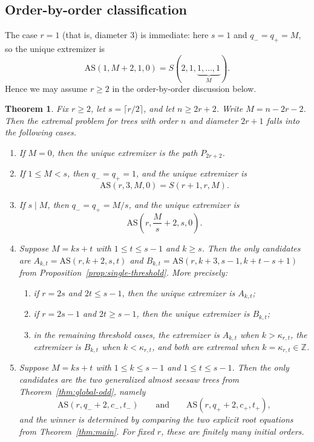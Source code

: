 \documentclass[11pt]{article}
\newtheorem{theorem}{Theorem}[section]
\theoremstyle{remark}
\newcommand{\AS}{\mathrm{AS}}
\begin{document}
\subsection{Order-by-order classification}
The case $r=1$ (that is, diameter $3$) is immediate: here $s=1$ and $q_-=q_+=M$, so the unique extremizer is
$$
\AS(1,M+2,1,0)=S(2,1,\underbrace{1,\dots,1}_{M}).
$$
Hence we may assume $r\ge 2$ in the order-by-order discussion below.

\begin{theorem}\label{thm:all-orders}
Fix $r\ge 2$, let $s=\lceil r/2\rceil$, and let $n\ge 2r+2$.
Write $M=n-2r-2$.
Then the extremal problem for trees with order $n$ and diameter $2r+1$ falls into the following cases.
\begin{enumerate}[label=\textnormal{(\roman*)}]
    \item If $M=0$, then the unique extremizer is the path $P_{2r+2}$.
    \item If $1\le M<s$, then $q_-=q_+=1$, and the unique extremizer is
    $$
    \AS(r,3,M,0)=S(r+1,r,M).
    $$
    \item If $s\mid M$, then $q_-=q_+=M/s$, and the unique extremizer is
    $$
    \AS\!\left(r,\frac{M}{s}+2,s,0\right).
    $$
    \item Suppose $M=ks+t$ with $1\le t\le s-1$ and $k\ge s$.
    Then the only candidates are $A_{k,t}=\AS(r,k+2,s,t)$ and $B_{k,t}=\AS(r,k+3,s-1,k+t-s+1)$ from Proposition~\ref{prop:single-threshold}.
    More precisely:
    \begin{enumerate}[label=\textnormal{(\alph*)}]
        \item if $r=2s$ and $2t\le s-1$, then the unique extremizer is $A_{k,t}$;
        \item if $r=2s-1$ and $2t\ge s-1$, then the unique extremizer is $B_{k,t}$;
        \item in the remaining threshold cases, the extremizer is $A_{k,t}$ when $k>\kappa_{r,t}$,
        the extremizer is $B_{k,t}$ when $k<\kappa_{r,t}$, and both are extremal when $k=\kappa_{r,t}\in\mathbb Z$.
    \end{enumerate}
    \item Suppose $M=ks+t$ with $1\le k\le s-1$ and $1\le t\le s-1$.
    Then the only candidates are the two generalized almost seesaw trees from Theorem~\ref{thm:global-odd}, namely
    $$
    \AS(r,q_-+2,c_-,t_-)
    \qquad\text{and}\qquad
    \AS(r,q_++2,c_+,t_+),
    $$
    and the winner is determined by comparing the two explicit root equations from Theorem~\ref{thm:main}.
    For fixed $r$, these are finitely many initial orders.
\end{enumerate}
\end{theorem}
\end{document}
